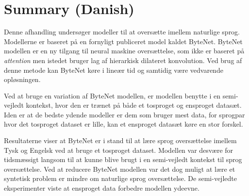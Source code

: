 \chapter{Summary (Danish)}

Denne afhandling undersøger modeller til at oversætte imellem naturlige sprog. Modellerne er baseret på en fornyligt publiceret model kaldet ByteNet. ByteNet modellen er en ny tilgang til neural maskine oversættelse, som ikke er baseret på \textit{attention} men istedet bruger lag af hierarkisk dilateret konvolution. Ved brug af denne metode kan ByteNet køre i lineær tid og samtidig være vedvarende opløsningen.

Ved at bruge en variation af ByteNet modellen, er modellen benytte i en semi-vejledt kontekst, hvor den er trænet på både et tosproget og ensproget datasæt. Iden er at de bedste ydende modeller er dem som bruger mest data, for sprogpar hvor det tosproget dataset er lille, kan et ensproget datasæt køre en stor forskel.

Resultaterne viser at ByteNet er i stand til at lære sprog oversættelse imellem Tysk og Engelsk ved at bruge et tosproget dataset. Modellen var desvære for tidsmæssigt langsom til at kunne blive brugt i en semi-vejledt kontekst til sprog oversættelse. Ved at reducere ByteNet modellen var det dog muligt at lære et syntetisk problem er mindre om naturlige sprog oversættelse. De semi-vejledte eksperimenter viste at ensproget data forbedre modellen ydeevne.
